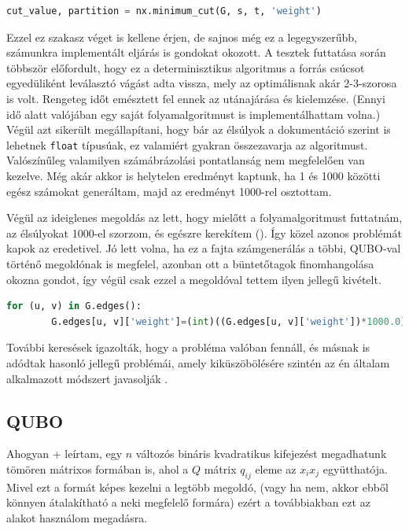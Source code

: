 \begin{lstlisting}[language=Python,caption=Minimális vágás folyamalgoritmussal,label=code:minCutFlow]
	cut_value, partition = nx.minimum_cut(G, s, t, 'weight')
\end{lstlisting}

Ezzel ez szakasz véget is kellene érjen, de sajnos még ez a legegyszerűbb, számunkra implementált eljárás is gondokat okozott. A tesztek futtatása során többször előfordult, hogy ez a determinisztikus algoritmus a forrás csúcsot egyedüliként leválasztó vágást adta vissza, mely az optimálisnak akár 2-3-szorosa is volt. Rengeteg időt emésztett fel ennek az utánajárása és kielemzése. (Ennyi idő alatt valójában egy saját folyamalgoritmust is implementálhattam volna.) Végül azt sikerült megállapítani, hogy bár az élsúlyok a dokumentáció szerint is lehetnek \verb+float+ típusúak, ez valamiért gyakran összezavarja az algoritmust. Valószínűleg valamilyen számábrázolási pontatlanság nem megfelelően van kezelve. Még akár akkor is helytelen eredményt kaptunk, ha 1 és 1000 közötti egész számokat generáltam, majd az eredményt 1000-rel osztottam.

Végül az ideiglenes megoldás az lett, hogy mielőtt a folyamalgoritmust futtatnám, az élsúlyokat 1000-el szorzom, és egészre kerekítem (). Így közel azonos problémát kapok az eredetivel. Jó lett volna, ha ez a fajta számgenerálás a többi, QUBO-val történő megoldónak is megfelel, azonban ott a büntetőtagok finomhangolása okozna gondot, így végül csak ezzel a megoldóval tettem ilyen jellegű kivételt.

\begin{lstlisting}[language=Python,caption=Súlyok egésszé konvertálása,label=code:minCutFlowFloat]
	for (u, v) in G.edges():
		G.edges[u, v]['weight']=(int)((G.edges[u, v]['weight'])*1000.0)
\end{lstlisting}


További keresések igazolták, hogy a probléma valóban fennáll, és másnak is adódtak hasonló jellegű problémái, amely kiküszöbölésére szintén az én általam alkalmazott módszert javasolják \cite{NetworkXFloat}.

\subsection{QUBO}
Ahogyan \az+ leírtam, egy $n$ változós bináris kvadratikus kifejezést megadhatunk tömören mátrixos formában is, ahol a $Q$ mátrix $q_{ij}$ eleme az $x_i x_j$ együtthatója. Mivel ezt a formát képes kezelni a legtöbb megoldó, (vagy ha nem, akkor ebből könnyen átalakítható a neki megfelelő formára) ezért a továbbiakban ezt az alakot használom megadásra.

